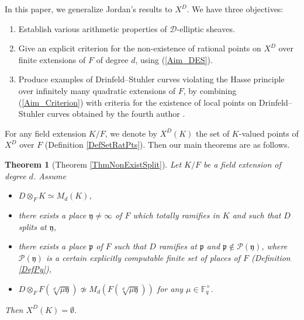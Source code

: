 \documentclass[10pt]{amsart}
\theoremstyle{plain}
\newtheorem{thm}{Theorem}[section]
\theoremstyle{definition}
\newcommand{\cP}{\mathcal{P}}
\newcommand{\cR}{\mathcal{R}}
\newcommand{\bF}{\mathbb{F}}
\newcommand{\sD}{\mathscr{D}}
\newcommand{\frp}{\mathfrak{p}}
\newcommand{\fry}{\mathfrak{y}}
\begin{document}
In this paper, we generalize Jordan's results to $X^D$. We have three objectives:
\begin{enumerate}
	\item\label{Aim_DES} Establish various arithmetic properties of 
	$\sD$-elliptic sheaves.
	\item\label{Aim_Criterion} Give an explicit criterion for the non-existence 
	of rational points on $X^D$ over finite extensions of $F$ of degree $d$, 
	using (\ref{Aim_DES}).
	\item\label{Aim_HPV} Produce examples of Drinfeld--Stuhler curves
	violating the Hasse principle over infinitely many quadratic extensions of 
	$F$, by combining (\ref{Aim_Criterion}) with criteria for the existence 
	of local points on Drinfeld--Stuhler curves obtained by the fourth author 
	\cite{Pap_loc}.
\end{enumerate}

For any field extension $K/F$, we denote by $X^D(K)$ the set of $K$-valued points of $X^D$ over $F$ (Definition \ref{DefSetRatPts}).
Then our main theorems are as follows.

\begin{thm}[Theorem \ref{ThmNonExistSplit}]\label{ThmIntroCriterion}
	Let $K/F$ be a field extension of degree $d$. Assume
	\begin{itemize}
		\item $D\otimes_F K\simeq M_d(K)$,
		\item there exists a place $\fry\neq \infty$ of $F$ which totally ramifies in $K$ and such that $D$ splits at $\fry$,
		\item there exists a place $\frp$ of $F$ such that $D$ ramifies at $\frp$ and $\frp\notin\cP(\fry)$,
		where $\cP(\fry)$ is a certain explicitly computable finite set of places of $F$ (Definition \ref{DefPy}),
		\item $D\otimes_F F(\sqrt[d]{\mu\fry})\not\simeq M_d(F(\sqrt[d]{\mu\fry}))$ for any $\mu\in \bF_q^\times$.
	\end{itemize} 
	Then $X^D(K)=\emptyset$.
\end{thm}
\end{document}
